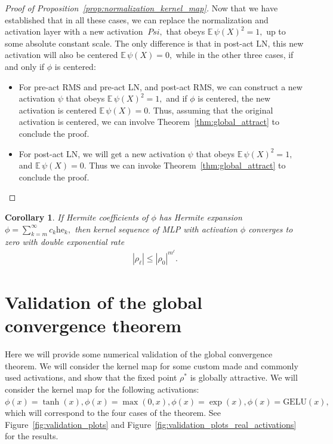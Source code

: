 \documentclass[twoside]{article}
\newcommand{\E}{\mathbb{E}\,}
\newcommand{\he}{\mathrm{he}}
\newtheorem{corollary}{Corollary}
\theoremstyle{definition}
\begin{document}
\begin{proof}[Proof of Proposition~\ref{prop:normalization_kernel_map}]
Now that we have established that in all these cases, we can replace the normalization and activation layer with a new activation $\ Psi,$ that obeys $\E \psi(X)^2 = 1,$ up to some absolute constant scale. The only difference is that in post-act LN, this new activation will also be centered $\E \psi(X) = 0,$ while in the other three cases, if and only if $\phi$ is centered:

\begin{itemize}
    \item For pre-act RMS and pre-act LN, and post-act RMS, we can construct a new activation $\psi$ that obeys $\E \psi(X)^2 = 1,$ and if $\phi$ is centered, the new activation is centered $\E \psi(X) = 0.$ Thus, assuming that the original activation is centered, we can involve Theorem~\ref{thm:global_attract} to conclude the proof.
    \item For post-act LN, we will get a new activation $\psi$ that obeys $\E \psi(X)^2 = 1,$ and $\E \psi(X) = 0.$ Thus we can invoke Theorem~\ref{thm:global_attract} to conclude the proof.
\end{itemize}
\end{proof}

\begin{corollary}\label{cor:double_exp}
    If Hermite coefficients of $\phi$ has Hermite expansion $\phi = \sum_{k=m}^\infty c_k \he_k,$ then kernel sequence of MLP with activation $\phi$ converges to zero with double exponential rate 
    \begin{align*}
        |\rho_\ell| \le |\rho_0|^{m^\ell}.
    \end{align*}
\end{corollary}


\section{Validation of the global convergence theorem}\label{sec:experiments}
Here we will provide some numerical validation of the global convergence theorem. We will consider the kernel map for some custom made and commonly used activations, and show that the fixed point $\rho^*$ is globally attractive. We will consider the kernel map for the following activations: $\phi(x) = \tanh(x), \phi(x) = \max(0,x), \phi(x) = \exp(x), \phi(x) = \text{GELU}(x),$ which will correspond to the four cases of the theorem. See Figure~\ref{fig:validation_plots} and Figure~\ref{fig:validation_plots_real_activations} for the results.
\end{document}
